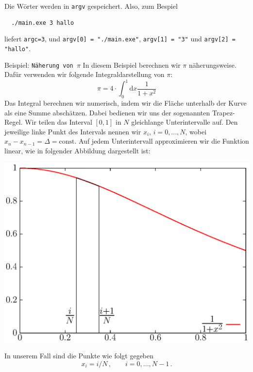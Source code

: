 Die Wörter werden in \verb|argv| gespeichert.
Also, zum Bespiel
\begin{verbatim}
  ./main.exe 3 hallo
\end{verbatim}
liefert \verb|argc=3|, und \verb|argv[0] = "./main.exe"|, \verb|argv[1] = "3"| und \verb|argv[2] = "hallo"|.
\newpage
\begin{myexampleprogram}{Beispiel: \texttt{Näherung von $\pi$}}
  In diesem Beispiel berechnen wir $\pi$ näherungsweise.
  Dafür verwenden wir folgende Integraldarstellung von $\pi$:
  \begin{equation}
    \pi=4\cdot \int_{0}^{1} \mathrm{d}x \dfrac{1}{1+x^2}
  \end{equation}
  Das Integral berechnen wir numerisch, indem wir die Fläche unterhalb der Kurve als eine Summe abschätzen.
  Dabei bedienen wir uns der sogenannten Trapez-Regel.
  Wir teilen das Interval $[0,1]$ in $N$ gleichlange Unterintervalle auf.
  Den jeweilige linke Punkt des Intervals nennen wir $x_i$, $i=0,...,N$, wobei $x_n-x_{n-1}=\Delta=\mathrm{const}$.
  Auf jedem Unterintervall approximieren wir die Funktion linear, wie in folgender Abbildung dargestellt ist:
  \vspace{-5cm}
  \begin{center}
    \includegraphics[width=.8\linewidth]{trapez1.ps}
  \end{center}
  \vspace{-6cm}
  In unserem Fall sind die Punkte wie folgt gegeben
  \begin{displaymath}
    x_i = i/N\,,\qquad i = 0, ..., N-1\,.
  \end{displaymath}



\end{myexampleprogram}
